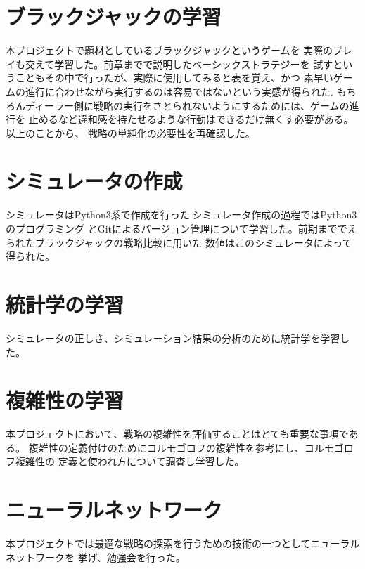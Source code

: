 \section{ブラックジャックの学習}
本プロジェクトで題材としているブラックジャックというゲームを
実際のプレイも交えて学習した。前章までで説明したベーシックストラテジーを
試すということもその中で行ったが、実際に使用してみると表を覚え、かつ
素早いゲームの進行に合わせながら実行するのは容易ではないという実感が得られた.
もちろんディーラー側に戦略の実行をさとられないようにするためには、ゲームの進行を
止めるなど違和感を持たせるような行動はできるだけ無くす必要がある。以上のことから、
戦略の単純化の必要性を再確認した。

\section{シミュレータの作成}
シミュレータはPython3系で作成を行った.シミュレータ作成の過程ではPython3のプログラミング
とGitによるバージョン管理について学習した。前期まででえられたブラックジャックの戦略比較に用いた
数値はこのシミュレータによって得られた。

\section{統計学の学習}
シミュレータの正しさ、シミュレーション結果の分析のために統計学を学習した。

\section{複雑性の学習}
本プロジェクトにおいて、戦略の複雑性を評価することはとても重要な事項である。
複雑性の定義付けのためにコルモゴロフの複雑性を参考にし、コルモゴロフ複雑性の
定義と使われ方について調査し学習した。

\section{ニューラルネットワーク}
本プロジェクトでは最適な戦略の探索を行うための技術の一つとしてニューラルネットワークを
挙げ、勉強会を行った。
